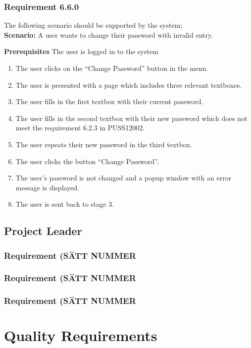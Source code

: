 \documentclass{article}
\begin{document}
\subsubsection{Requirement 6.6.0}
The following scenario should be supported by the system;\\

\textbf{Scenario:} A user wants to change their password with invalid entry.

\textbf{Prerequisites} The user is logged in to the system

\begin{enumerate}
    \item The user clicks on the “Change Password” button in the menu.
    \item The user is presented with a page which includes three relevant textboxes.
    \item The user fills in the first textbox with their current password.
    \item The user fills in the second textbox with their new password which does not meet the requirement 6.2.3 in PUSS12002.
    \item The user repeats their new password in the third textbox.
    \item The user clicks the button “Change Password”.
    \item The user's password is not changed and a popup window with an error message is displayed.
    \item The user is sent back to stage 3.
\end{enumerate}

\subsection{Project Leader}
\subsubsection{Requirement (SÄTT NUMMER}
\subsubsection{Requirement (SÄTT NUMMER}
\subsubsection{Requirement (SÄTT NUMMER}



\section{Quality Requirements}
\end{document}
